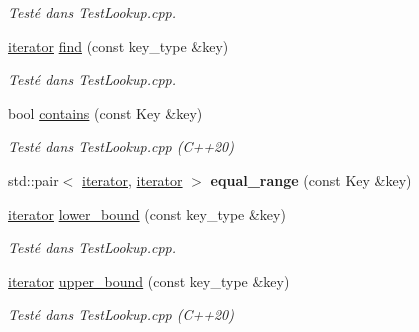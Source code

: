 \begin{DoxyCompactItemize}
\begin{DoxyCompactList}\small\item\em Testé dans Test\+Lookup.\+cpp. \end{DoxyCompactList}\item 
\mbox{\label{classMultimap_a111dfc88089590ec1f94de7e6e3d2715}} 
\hyperlink{classMultimapIterator}{iterator} \hyperlink{classMultimap_a111dfc88089590ec1f94de7e6e3d2715}{find} (const key\+\_\+type \&key)
\begin{DoxyCompactList}\small\item\em Testé dans Test\+Lookup.\+cpp. \end{DoxyCompactList}\item 
\mbox{\label{classMultimap_a0fa9b709bbb25ef657d7ff8f70402203}} 
bool \hyperlink{classMultimap_a0fa9b709bbb25ef657d7ff8f70402203}{contains} (const Key \&key)
\begin{DoxyCompactList}\small\item\em Testé dans Test\+Lookup.\+cpp (C++20) \end{DoxyCompactList}\item 
\mbox{\label{classMultimap_a7402d5ca0eead6166d93e8fa154bdeee}} 
std\+::pair$<$ \hyperlink{classMultimapIterator}{iterator}, \hyperlink{classMultimapIterator}{iterator} $>$ {\bfseries equal\+\_\+range} (const Key \&key)
\item 
\mbox{\label{classMultimap_a987440eb1d580fc0d8231857e27517b4}} 
\hyperlink{classMultimapIterator}{iterator} \hyperlink{classMultimap_a987440eb1d580fc0d8231857e27517b4}{lower\+\_\+bound} (const key\+\_\+type \&key)
\begin{DoxyCompactList}\small\item\em Testé dans Test\+Lookup.\+cpp. \end{DoxyCompactList}\item 
\mbox{\label{classMultimap_a5cef442af3427edbe14da2668e2c59cd}} 
\hyperlink{classMultimapIterator}{iterator} \hyperlink{classMultimap_a5cef442af3427edbe14da2668e2c59cd}{upper\+\_\+bound} (const key\+\_\+type \&key)
\begin{DoxyCompactList}\small\item\em Testé dans Test\+Lookup.\+cpp (C++20) \end{DoxyCompactList}\item 

\end{DoxyCompactItemize}
